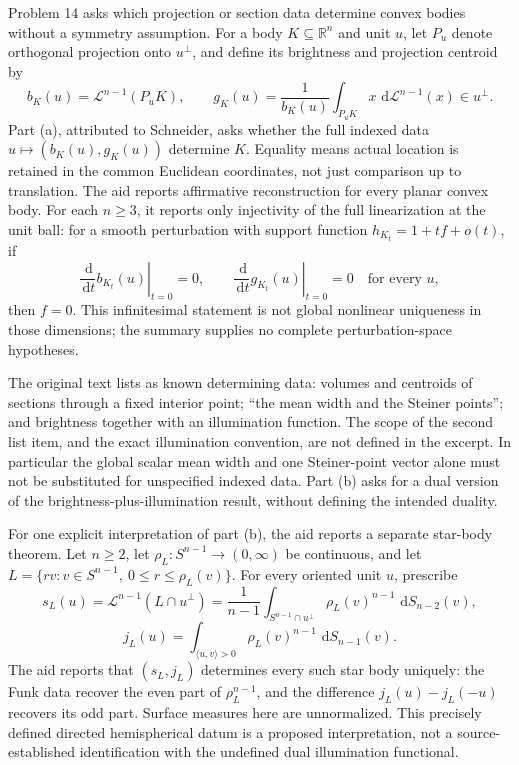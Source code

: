 \documentclass[11pt]{article}
\newcommand{\R}{\mathbb{R}}
\newcommand{\dd}{\,\mathrm{d}}
\begin{document}
Problem 14 asks which projection or section data determine convex bodies without a symmetry assumption. For a body \(K\subseteq\R^n\) and unit \(u\), let \(P_u\) denote orthogonal projection onto \(u^\perp\), and define its brightness and projection centroid by
\[
 b_K(u)=\mathcal L^{n-1}(P_uK),\qquad
 g_K(u)=\frac{1}{b_K(u)}\int_{P_uK}x\,\dd\mathcal L^{n-1}(x)\in u^\perp.
\]
Part (a), attributed to Schneider, asks whether the full indexed data \(u\mapsto(b_K(u),g_K(u))\) determine \(K\). Equality means actual location is retained in the common Euclidean coordinates, not just comparison up to translation. The aid reports affirmative reconstruction for every planar convex body. For each \(n\geq3\), it reports only injectivity of the full linearization at the unit ball: for a smooth perturbation with support function \(h_{K_t}=1+tf+o(t)\), if
\[
 \left.\frac{\dd}{\dd t}b_{K_t}(u)\right|_{t=0}=0,
 \qquad
 \left.\frac{\dd}{\dd t}g_{K_t}(u)\right|_{t=0}=0\quad\text{for every }u,
\]
then \(f=0\). This infinitesimal statement is not global nonlinear uniqueness in those dimensions; the summary supplies no complete perturbation-space hypotheses.

The original text lists as known determining data: volumes and centroids of sections through a fixed interior point; ``the mean width and the Steiner points''; and brightness together with an illumination function. The scope of the second list item, and the exact illumination convention, are not defined in the excerpt. In particular the global scalar mean width and one Steiner-point vector alone must not be substituted for unspecified indexed data. Part (b) asks for a dual version of the brightness-plus-illumination result, without defining the intended duality.

For one explicit interpretation of part (b), the aid reports a separate star-body theorem. Let \(n\geq2\), let \(\rho_L:S^{n-1}\to(0,\infty)\) be continuous, and let
\(L=\{rv:v\in S^{n-1},\ 0\leq r\leq\rho_L(v)\}\).
For every oriented unit \(u\), prescribe
\[
 s_L(u)=\mathcal L^{n-1}(L\cap u^\perp)
 =\frac1{n-1}\int_{S^{n-1}\cap u^\perp}\rho_L(v)^{n-1}\,\dd S_{n-2}(v),
\]
\[
 j_L(u)=\int_{\langle u,v\rangle>0}\rho_L(v)^{n-1}\,\dd S_{n-1}(v).
\]
The aid reports that \((s_L,j_L)\) determines every such star body uniquely: the Funk data recover the even part of \(\rho_L^{n-1}\), and the difference \(j_L(u)-j_L(-u)\) recovers its odd part. Surface measures here are unnormalized. This precisely defined directed hemispherical datum is a proposed interpretation, not a source-established identification with the undefined dual illumination functional.
\end{document}
